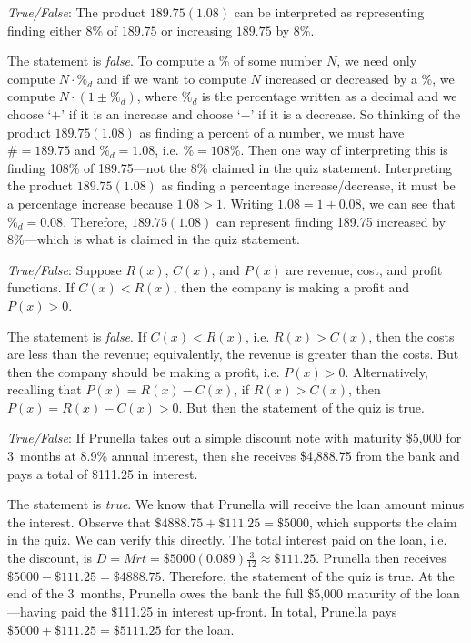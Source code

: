 \documentclass[11pt,letterpaper]{article}
\begin{document}
\thispagestyle{title}

\quizsol \textit{True/False}: The product $189.75(1.08)$ can be interpreted as representing finding either 8\% of $189.75$ or increasing $189.75$ by 8\%. \pspace

\sol The statement is \textit{false}. To compute a \% of some number $N$, we need only compute $N \cdot \%_d$ and if we want to compute $N$ increased or decreased by a \%, we compute $N \cdot (1 \pm \%_d)$, where $\%_d$ is the percentage written as a decimal and we choose `$+$' if it is an increase and choose `$-$' if it is a decrease. So thinking of the product $189.75(1.08)$ as finding a percent of a number, we must have $\#= 189.75$ and $\%_d= 1.08$, i.e. $\%= 108\%$. Then one way of interpreting this is finding 108\% of 189.75---not the 8\% claimed in the quiz statement. Interpreting the product $189.75(1.08)$ as finding a percentage increase/decrease, it must be a percentage increase because $1.08 > 1$. Writing $1.08= 1 + 0.08$, we can see that $\%_d= 0.08$. Therefore, $189.75(1.08)$ can represent finding 189.75 increased by 8\%---which is what is claimed in the quiz statement. \pvspace{1.3cm}



\quizsol \textit{True/False}: Suppose $R(x)$, $C(x)$, and $P(x)$ are revenue, cost, and profit functions. If $C(x) < R(x)$, then the company is making a profit and $P(x) > 0$. \pspace

\sol The statement is \textit{false}. If $C(x) < R(x)$, i.e. $R(x) > C(x)$, then the costs are less than the revenue; equivalently, the revenue is greater than the costs. But then the company should be making a profit, i.e. $P(x) > 0$. Alternatively, recalling that $P(x)= R(x) - C(x)$, if $R(x) > C(x)$, then $P(x)= R(x) - C(x) > 0$. But then the statement of the quiz is true. \pvspace{1.3cm}



\quizsol \textit{True/False}: If Prunella takes out a simple discount note with maturity \$5,000 for 3~months at 8.9\% annual interest, then she receives \$4,888.75 from the bank and pays a total of \$111.25 in interest. \pspace

\sol The statement is \textit{true}. We know that Prunella will receive the loan amount minus the interest. Observe that $\$4888.75 + \$111.25= \$5000$, which supports the claim in the quiz. We can verify this directly. The total interest paid on the loan, i.e. the discount, is $D= Mrt= \$5000(0.089) \frac{3}{12} \approx \$111.25$. Prunella then receives $\$5000 - \$111.25= \$4888.75$. Therefore, the statement of the quiz is true. At the end of the 3~months, Prunella owes the bank the full \$5,000 maturity of the loan---having paid the \$111.25 in interest up-front. In total, Prunella pays $\$5000 + \$111.25= \$5111.25$ for the loan. \pvspace{1.3cm}
\end{document}
